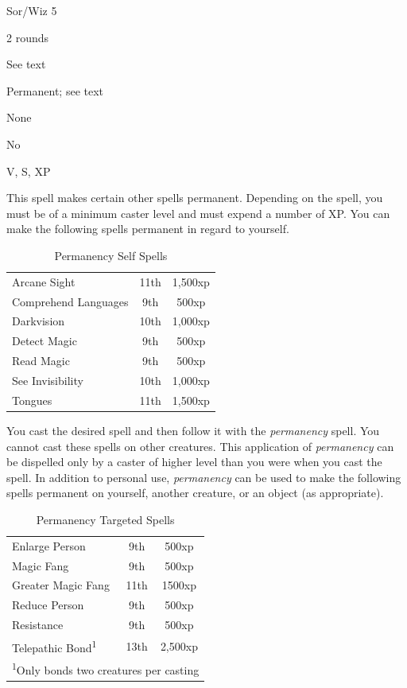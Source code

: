 
\begin{description*}
\item[Level:] Sor/Wiz 5
\item[Casting Time:] 2 rounds
\item[Range:] See text
\item[Duration:] Permanent; see text
\item[Saving Throw:] None
\item[Spell Resistance:] No
\item[Components:] V, S, XP
\end{description*}

This spell makes certain other spells permanent.
Depending on the spell, you must be of a minimum caster level and must expend a
number of XP.
You can make the following spells permanent in regard to yourself.
\begin{table}[htb]
\caption{Permanency Self Spells}
\centering
\begin{tabular}{l c c}
Arcane Sight & 11th & 1,500xp\\
Comprehend Languages & 9th & 500xp\\
Darkvision & 10th & 1,000xp\\
Detect Magic & 9th & 500xp\\
Read Magic & 9th & 500xp\\
See Invisibility & 10th & 1,000xp\\
Tongues & 11th & 1,500xp\\
\end{tabular}
\end{table}
You cast the desired spell and then follow it with the \textit{permanency} spell.
You cannot cast these spells on other creatures. This application of \textit{permanency
}can be dispelled only by a caster of higher level than you were when you cast
the spell.
In addition to personal use, \textit{permanency} can be used to make the following
spells permanent on yourself, another creature, or an object (as appropriate).
\begin{table}[htb]
\caption{Permanency Targeted Spells}
\centering
\begin{tabular}{l c c}
Enlarge Person & 9th & 500xp\\
Magic Fang & 9th & 500xp\\
Greater Magic Fang & 11th & 1500xp\\
Reduce Person & 9th & 500xp\\
Resistance & 9th & 500xp\\
Telepathic Bond\textsuperscript{1} & 13th & 2,500xp\\
\multicolumn{3}{l}{\textsuperscript{1}Only bonds two creatures per casting}
\end{tabular}
\end{table}
